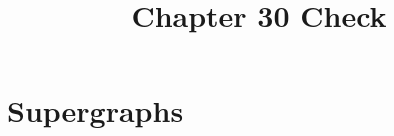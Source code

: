 \documentclass[11pt,a4paper]{article}
\title{Chapter 30 Check}
\author{}
\makeatletter
\numberwithin{equation}{subsection}
\newcommand{\checklabel}[2]{%
  \begingroup
  \def\@currentlabel{#2}%
  \label{#1}%
  \endgroup
}
\makeatother
\begin{document}
\maketitle
\setcounter{section}{29}
\section{Supergraphs}

\checklabel{eq:6.2.16}{6.2.16}
\checklabel{eq:26.3.31}{26.3.31}
\checklabel{eq:26.4.3}{26.4.3}
\checklabel{eq:26.6.5}{26.6.5}
\checklabel{eq:26.6.8}{26.6.8}
\checklabel{eq:26.6.12}{26.6.12}
\checklabel{eq:27.3.17}{27.3.17}






\end{document}
